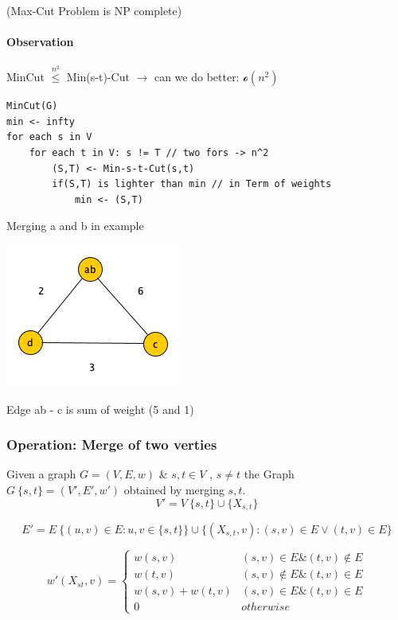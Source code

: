 (Max-Cut Problem is NP complete) 

\paragraph{Observation} MinCut $\stackrel{n^2}{\leq}$ Min(s-t)-Cut
$\rightarrow$ can we do better: $\mathcal{o}(n^2)$ \\

\begin{verbatim}
MinCut(G)
min <- infty
for each s in V 
    for each t in V: s != T // two fors -> n^2
        (S,T) <- Min-s-t-Cut(s,t)
        if(S,T) is lighter than min // in Term of weights
            min <- (S,T)
\end{verbatim}

Merging a and b in example \\
\begin{center}
	\includegraphics[scale=1]{img/graph8}
\end{center}

Edge ab - c is sum of weight (5 and 1)

\subsubsection{Operation: Merge of two verties}

Given a graph $G = (V,E,w)$ \& $s,t \in V$ , $s \neq t$ the Graph $G\ \{s,t\} = (V',E',w')$ obtained by merging $s,t$. \\

$$V' = V \ \{s,t\} \cup \{X_{s,t}\}$$

$$E' = E \ \{(u,v) \in E: u,v \in \{s,t\}\} \cup \{(X_{s,t},v): (s,v) \in E \lor (t,v) \in E\}$$

$$w'(X_{st},v) = \begin{cases}
w(s,v) & (s,v) \in E \& (t,v) \notin E \\
w(t,v) & (s,v) \notin E \& (t,v) \in  E \\
w(s,v) + w(t,v) & (s,v) \in E \& (t,v) \in E \\
0 & otherwise
\end{cases}$$

